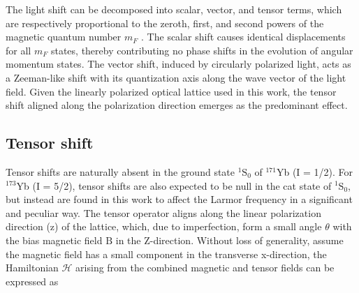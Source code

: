 \documentclass[pdflatex,sn-nature,centre]{sn-jnl}%
\begin{document}

The light shift can be decomposed into scalar, vector, and tensor terms, which are respectively proportional to the zeroth, first, and second powers of the magnetic quantum number ${m_F}$ \cite{LeKien2013Polarizability}. The scalar shift causes identical displacements for all ${m_F}$ states, thereby contributing no phase shifts in the evolution of angular momentum states. The vector shift, induced by circularly polarized light, acts as a Zeeman-like shift with its quantization axis along the wave vector of the light field. Given the linearly polarized optical lattice used in this work, the tensor shift aligned along the polarization direction emerges as the predominant effect.


\subsection*{Tensor shift}

Tensor shifts are naturally absent in the ground state $^{1}\mathrm{S}_0$ of $^{171}$Yb (I = 1/2). For $^{173}$Yb (I = 5/2), tensor shifts are also expected to be null in the cat state of $^{1}\mathrm S_0$, but instead are found in this work to affect the Larmor frequency in a significant and peculiar way. The tensor operator aligns along the linear polarization direction (z) of the lattice, which, due to imperfection, form a small angle $\theta$ with the bias magnetic field $\mathrm B$ in the Z-direction. Without loss of generality, assume the magnetic field has a small component in the transverse x-direction, the Hamiltonian $\mathscr H$ arising from the combined magnetic and tensor fields can be expressed as
\end{document}
